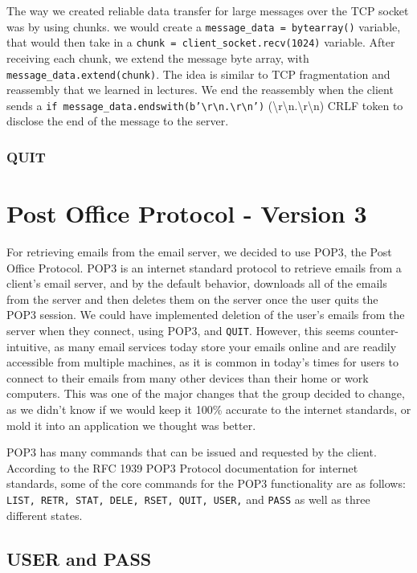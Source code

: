 \documentclass[12pt]{article}
\begin{document}
The way we created reliable data transfer for large messages over the TCP socket was by using chunks. we would create a \texttt{message\_data = bytearray()} variable, that would then take in a \texttt{chunk = client\_socket.recv(1024)} variable. After receiving each chunk, we extend the message byte array, with \texttt{message\_data.extend(chunk)}. The idea is similar to TCP fragmentation and reassembly that we learned in lectures. We end the reassembly when the client sends a \texttt{if message\_data.endswith(b'\textbackslash r\textbackslash n.\textbackslash r\textbackslash n')} (\textbackslash r\textbackslash n.\textbackslash r\textbackslash n) CRLF token to disclose the end of the message to the server.

\subsubsection{QUIT}

\section{Post Office Protocol - Version 3}
For retrieving emails from the email server, we decided to use POP3, the Post Office Protocol. POP3 is an internet standard protocol to retrieve emails from a client’s email server, and by the default behavior, downloads all of the emails from the server and then deletes them on the server once the user quits the POP3 session. We could have implemented deletion of the user’s emails from the server when they connect, using POP3, and \texttt{QUIT}. However, this seems counter-intuitive, as many email services today store your emails online and are readily accessible from multiple machines, as it is common in today's times for users to connect to their emails from many other devices than their home or work computers. This was one of the major changes that the group decided to change, as we didn't know if we would keep it 100\% accurate to the internet standards, or mold it into an application we thought was better.

POP3 has many commands that can be issued and requested by the client. According to the RFC 1939 POP3 Protocol documentation for internet standards, some of the core commands for the POP3 functionality are as follows: \texttt{LIST, RETR, STAT, DELE, RSET, QUIT, USER,} and \texttt{PASS} as well as three different states. 

\subsection{USER and PASS}
\end{document}
